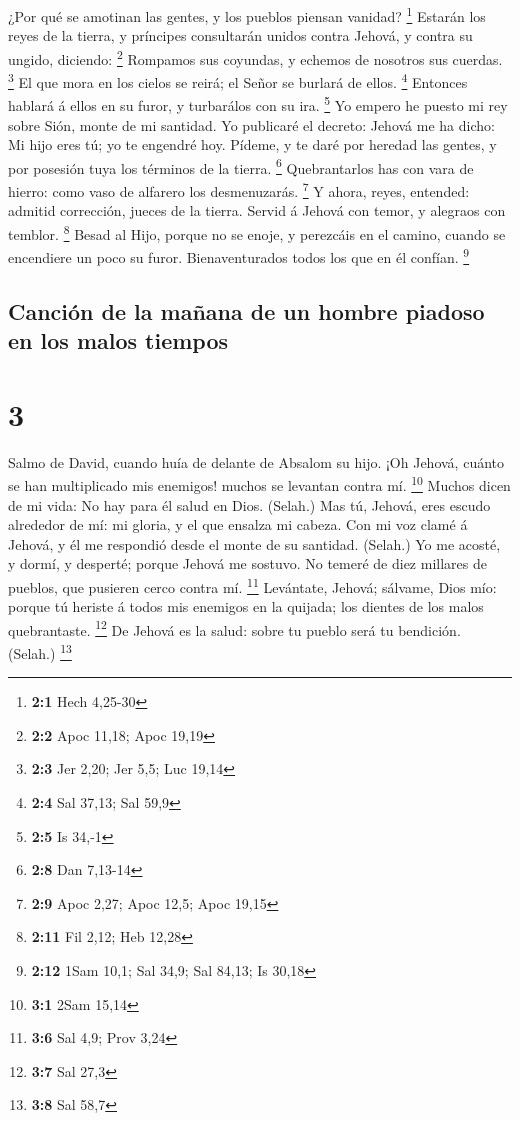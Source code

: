  ¿Por qué se amotinan las gentes, y los pueblos piensan
vanidad? \footnote{\textbf{2:1} Hech 4,25-30}  Estarán los
reyes de la tierra, y príncipes consultarán unidos contra Jehová, y
contra su ungido, diciendo: \footnote{\textbf{2:2} Apoc 11,18; Apoc
  19,19}  Rompamos sus coyundas, y echemos de nosotros sus
cuerdas. \footnote{\textbf{2:3} Jer 2,20; Jer 5,5; Luc 19,14}
 El que mora en los cielos se reirá; el Señor se burlará de
ellos. \footnote{\textbf{2:4} Sal 37,13; Sal 59,9}  Entonces
hablará á ellos en su furor, y turbarálos con su ira. \footnote{\textbf{2:5}
  Is 34,-1}  Yo empero he puesto mi rey sobre Sión, monte de
mi santidad.  Yo publicaré el decreto: Jehová me ha dicho:
Mi hijo eres tú; yo te engendré hoy.  Pídeme, y te daré por
heredad las gentes, y por posesión tuya los términos de la tierra.
\footnote{\textbf{2:8} Dan 7,13-14}  Quebrantarlos has con
vara de hierro: como vaso de alfarero los desmenuzarás. \footnote{\textbf{2:9}
  Apoc 2,27; Apoc 12,5; Apoc 19,15}  Y ahora, reyes,
entended: admitid corrección, jueces de la tierra.  Servid
á Jehová con temor, y alegraos con temblor. \footnote{\textbf{2:11} Fil
  2,12; Heb 12,28}  Besad al Hijo, porque no se enoje, y
perezcáis en el camino, cuando se encendiere un poco su furor.
Bienaventurados todos los que en él confían. \footnote{\textbf{2:12}
  1Sam 10,1; Sal 34,9; Sal 84,13; Is 30,18}

\hypertarget{canciuxf3n-de-la-mauxf1ana-de-un-hombre-piadoso-en-los-malos-tiempos}{%
\subsection{Canción de la mañana de un hombre piadoso en los malos
tiempos}\label{canciuxf3n-de-la-mauxf1ana-de-un-hombre-piadoso-en-los-malos-tiempos}}

\hypertarget{section-2}{%
\section{3}\label{section-2}}

 Salmo de David, cuando huía de delante de Absalom su hijo.
¡Oh Jehová, cuánto se han multiplicado mis enemigos! muchos se levantan
contra mí. \footnote{\textbf{3:1} 2Sam 15,14}  Muchos dicen
de mi vida: No hay para él salud en Dios. (Selah.)  Mas tú,
Jehová, eres escudo alrededor de mí: mi gloria, y el que ensalza mi
cabeza.  Con mi voz clamé á Jehová, y él me respondió desde
el monte de su santidad. (Selah.)  Yo me acosté, y dormí, y
desperté; porque Jehová me sostuvo.  No temeré de diez
millares de pueblos, que pusieren cerco contra mí. \footnote{\textbf{3:6}
  Sal 4,9; Prov 3,24}  Levántate, Jehová; sálvame, Dios mío:
porque tú heriste á todos mis enemigos en la quijada; los dientes de los
malos quebrantaste. \footnote{\textbf{3:7} Sal 27,3}  De
Jehová es la salud: sobre tu pueblo será tu bendición. (Selah.)
\footnote{\textbf{3:8} Sal 58,7}


